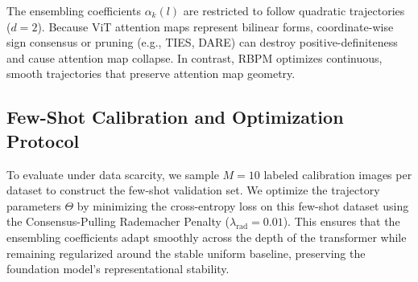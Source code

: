 \documentclass{article}
\theoremstyle{plain}
\theoremstyle{definition}
\theoremstyle{remark}
\begin{document}
The ensembling coefficients $\alpha_k(l)$ are restricted to follow quadratic trajectories ($d=2$). Because ViT attention maps represent bilinear forms, coordinate-wise sign consensus or pruning (e.g., TIES, DARE) can destroy positive-definiteness and cause attention map collapse. In contrast, RBPM optimizes continuous, smooth trajectories that preserve attention map geometry.

\subsection{Few-Shot Calibration and Optimization Protocol}
To evaluate under data scarcity, we sample $M = 10$ labeled calibration images per dataset to construct the few-shot validation set. We optimize the trajectory parameters $\Theta$ by minimizing the cross-entropy loss on this few-shot dataset using the Consensus-Pulling Rademacher Penalty ($\lambda_{\text{rad}} = 0.01$). This ensures that the ensembling coefficients adapt smoothly across the depth of the transformer while remaining regularized around the stable uniform baseline, preserving the foundation model's representational stability.
\end{document}
